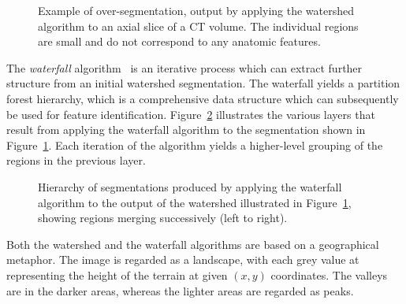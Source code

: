 \documentclass{jfp}
\begin{document}
\begin{figure}
\centering
\ifpdf
        \hspace{1mm}%
\else
\fi
\caption{Example of over-segmentation, output by applying the watershed
  algorithm to an axial slice of a CT volume. The individual regions
  are small and do not correspond to any anatomic features.}
\label{fig:oversegmented}
\end{figure}
%

The {\em waterfall\/} algorithm~\cite{beucher94,marcotegui} is an
iterative process which can extract further structure from an initial
watershed segmentation. The waterfall yields a partition forest
hierarchy, which is a comprehensive data structure which can
subsequently be used for feature identification.
Figure~\ref{fig:waterfall} illustrates the various layers that result
from applying the waterfall algorithm to the segmentation shown in
Figure~\ref{fig:oversegmented}.  Each iteration of the algorithm
yields a higher-level grouping of the regions in the previous layer.
\begin{figure}
\centering
\ifpdf
        \hspace{1mm}%
        \hspace{1mm}%
\else
\fi
\caption{Hierarchy of segmentations produced by applying the waterfall
  algorithm to the output of the watershed illustrated in
  Figure~\ref{fig:oversegmented}, showing regions merging successively
  (left to right).}
\label{fig:waterfall}
\end{figure}

Both the watershed and the waterfall algorithms are based on a
geographical metaphor. The image is regarded as a landscape, with each
grey value at representing the height of the terrain at given $(x,y)$
coordinates.
%
The valleys are
in the darker areas, whereas the lighter areas are regarded as peaks.
\end{document}
